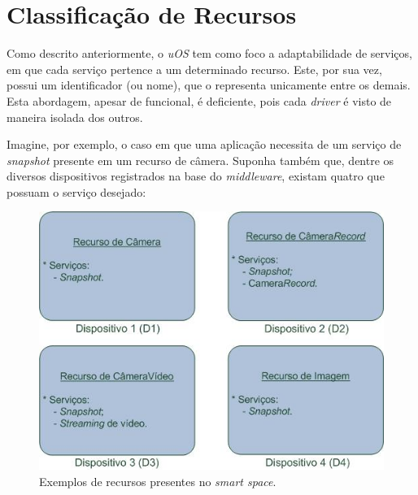 \section{Classificação de Recursos}

Como descrito anteriormente, o \emph{uOS} tem como foco a adaptabilidade de serviços, em que cada serviço pertence a um determinado recurso. Este, por sua vez, possui um identificador (ou nome), que o representa unicamente entre os demais. Esta abordagem, apesar de funcional, é deficiente, pois cada \emph{driver} é visto de maneira isolada dos outros.

Imagine, por exemplo, o caso em que uma aplicação necessita de um serviço de \emph{snapshot} presente em um recurso de câmera. Suponha também que, dentre os diversos dispositivos registrados na base do \emph{middleware}, existam quatro que possuam o serviço desejado:

\begin{figure}[ht]
	\center
	\includegraphics[scale=0.8]{imagens/recursos}
	\caption{Exemplos de recursos presentes no \emph{smart space}.}
	\label{fig:recursos}
\end{figure}

